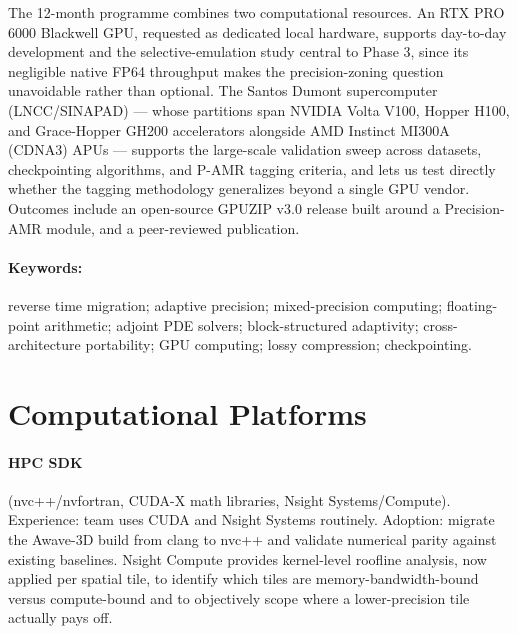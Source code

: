 \documentclass[12pt,a4paper]{article}
\newcommand{\pamr}{P\nobreakdash-AMR}
\begin{document}
The 12-month programme combines two computational resources. An RTX PRO 6000
Blackwell GPU, requested as dedicated local hardware, supports day-to-day
development and the selective-emulation study central to Phase 3, since its
negligible native FP64 throughput makes the precision-zoning question
unavoidable rather than optional. The Santos Dumont supercomputer
(LNCC/SINAPAD) --- whose partitions span NVIDIA Volta V100, Hopper H100, and
Grace-Hopper GH200 accelerators alongside AMD Instinct MI300A (CDNA3) APUs ---
supports the large-scale validation sweep across datasets, checkpointing
algorithms, and \pamr{} tagging criteria, and lets us test directly whether the
tagging methodology generalizes beyond a single GPU vendor. Outcomes include an
open-source GPUZIP v3.0 release built around a Precision-AMR module, and a
peer-reviewed publication.

\paragraph{Keywords:} reverse time migration; adaptive precision;
mixed-precision computing; floating-point arithmetic; adjoint PDE solvers;
block-structured adaptivity; cross-architecture portability; GPU computing;
lossy compression; checkpointing.

\fi

\iffalse

\section{Computational Platforms}

\paragraph{HPC SDK} (nvc++/nvfortran, CUDA-X math libraries, Nsight
Systems/Compute). Experience: team uses CUDA and Nsight Systems routinely.
Adoption: migrate the Awave-3D build from clang to nvc++ and validate numerical
parity against existing baselines. Nsight Compute provides kernel-level roofline
analysis, now applied per spatial tile, to identify which tiles are
memory-bandwidth-bound versus compute-bound and to objectively scope where a
lower-precision tile actually pays off.
\end{document}
